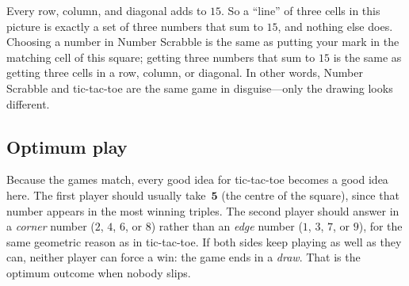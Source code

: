 \noindent
Every row, column, and diagonal adds to \(15\). So a ``line'' of three cells in
this picture is exactly a set of three numbers that sum to \(15\), and nothing
else does. Choosing a number in Number Scrabble is the same as putting your mark
in the matching cell of this square; getting three numbers that sum to \(15\)
is the same as getting three cells in a row, column, or diagonal. In other
words, Number Scrabble and tic-tac-toe are the same game in disguise---only the
drawing looks different.

\subsection*{Optimum play}
Because the games match, every good idea for tic-tac-toe becomes a good idea here.
The first player should usually take~\(\mathbf{5}\) (the centre of the square),
since that number appears in the most winning triples. The second player should
answer in a \emph{corner} number (\(2\), \(4\), \(6\), or \(8\)) rather than an
\emph{edge} number (\(1\), \(3\), \(7\), or \(9\)), for the same geometric
reason as in tic-tac-toe. If both sides keep playing as well as they can, neither
player can force a win: the game ends in a \emph{draw}. That is the optimum
outcome when nobody slips.
